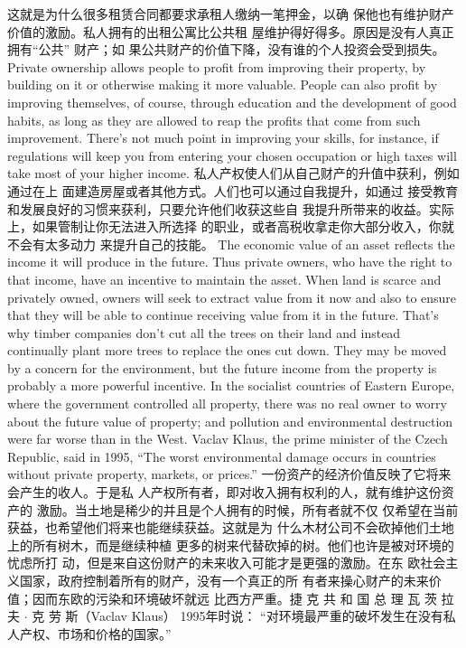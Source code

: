\begin{paracol}{2}
这就是为什么很多租赁合同都要求承租人缴纳一笔押金，以确
保他也有维护财产价值的激励。私人拥有的出租公寓比公共租
屋维护得好得多。原因是没有人真正拥有“公共” 财产；如
果公共财产的价值下降，没有谁的个人投资会受到损失。
\switchcolumn*
Private ownership allows people to profit from improving
their property, by building on it or otherwise making it more
valuable. People can also profit by improving themselves, of
course, through education and the development of good habits,
as long as they are allowed to reap the profits that come from
such improvement. There's not much point in improving your
skills, for instance, if regulations will keep you from entering
your chosen occupation or high taxes will take most of your
higher income.
\switchcolumn
私人产权使人们从自己财产的升值中获利，例如通过在上
面建造房屋或者其他方式。人们也可以通过自我提升，如通过
接受教育和发展良好的习惯来获利，只要允许他们收获这些自
我提升所带来的收益。实际上，如果管制让你无法进入所选择
的职业，或者高税收拿走你大部分收入，你就不会有太多动力
来提升自己的技能。
\switchcolumn*
The economic value of an asset reflects the income it will produce in the future. Thus private owners, who have the right to
that income, have an incentive to maintain the asset. When
land is scarce and privately owned, owners will seek to extract
value from it now and also to ensure that they will be able to
continue receiving value from it in the future. That's why timber companies don't cut all the trees on their land and instead
continually plant more trees to replace the ones cut down. They
may be moved by a concern for the environment, but the future
income from the property is probably a more powerful incentive. In the socialist countries of Eastern Europe, where the government controlled all property, there was no real owner to
worry about the future value of property; and pollution and environmental destruction were far worse than in the West. Vaclav Klaus, the prime minister of the Czech Republic, said in 1995, ``The worst environmental damage occurs in countries
without private property, markets, or prices.''
\switchcolumn
一份资产的经济价值反映了它将来会产生的收人。于是私
人产权所有者，即对收入拥有权利的人，就有维护这份资产的
激励。当土地是稀少的并且是个人拥有的时候，所有者就不仅
仅希望在当前获益，也希望他们将来也能继续获益。这就是为
什么木材公司不会砍掉他们土地上的所有树木，而是继续种植
更多的树来代替砍掉的树。他们也许是被对环境的忧虑所打
动，但是来自这份财产的未来收入可能才是更强的激励。在东
欧社会主义国家，政府控制着所有的财产，没有一个真正的所
有者来操心财产的未来价值；因而东欧的污染和环境破坏就远
比西方严重。捷 克 共 和 国 总 理 瓦 茨 拉 夫 $\cdot$ 克 劳 斯（Vaclav Klaus） 1995年时说： “对环境最严重的破坏发生在没有私人产权、市场和价格的国家。”

\end{paracol}
